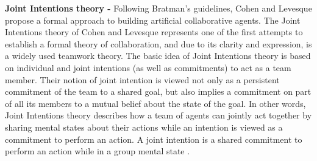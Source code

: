 \documentclass[a4paper, 10pt]{article}
\begin{document}
\begin{small}

\textbf{Joint Intentions theory -} Following Bratman's guidelines, Cohen and
Levesque propose a formal approach to building artificial collaborative agents.
The Joint Intentions theory of Cohen and Levesque \cite{cohen:teamwork,
cohen:intention-commitment, cohen:persistence-intention-commitment,
cohen:intentions, levesque:acting-together} represents one of the first attempts
to establish a formal theory of collaboration, and due to its clarity and
expression, is a widely used teamwork theory. The basic idea of Joint Intentions
theory is based on individual and joint intentions (as well as commitments) to
act as a team member. Their notion of joint intention is viewed not only as a
persistent commitment of the team to a shared goal, but also implies a
commitment on part of all its members to a mutual belief about the state of the
goal. In other words, Joint Intentions theory describes how a team of agents can
jointly act together by sharing mental states about their actions while an
intention is viewed as a commitment to perform an action. A joint intention is a
shared commitment to perform an action while in a group mental state
\cite{cohen:intention-commitment}.


\end{small}
\end{document}
